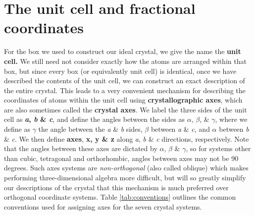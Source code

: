 \section{The unit cell and fractional coordinates}

 For the box we used to construct our ideal crystal, we give the name the \textbf{unit cell.}
 We still need not consider exactly how the atoms are arranged within that box, but since every box (or equivalently unit cell) is identical, once we have described the contents of the unit cell, we can construct an exact description of the entire crystal. 
 This leads to a very convenient mechanism for describing the coordinates of atoms within the unit cell using \textbf{crystallographic axes}, which are also sometimes called the \textbf{crystal axes}. We label the three sides of the unit cell as \textbf{\textit{a}, \textit{b} \& \textit{c}}, and define the angles between the sides as $\alpha$, $\beta$, \& $\gamma$, where we define as $\gamma$ the angle between the \textit{a} \& \textit{b} sides, $\beta$ between \textit{a }\& \textit{c}, and $\alpha$ between \textit{b} \& \textit{c}. We then define \textbf{axes}, \textbf{x, y \& z} along \textit{a}, \textit{b} \& \textit{c} directions, respectively. Note that the angles between these axes are dictated by $\alpha$, $\beta$ \& $\gamma$, so for systems other than cubic, tetragonal and orthorhombic, angles between axes may not be 90 degrees. Such axes systems are \textit{non-orthogonal} (also called oblique) which makes performing three-dimensional algebra more difficult, but will so greatly simplify our descriptions of the crystal that this mechanism is much preferred over orthogonal coordinate systems. Table \ref{tab:conventions} outlines the common conventions used for assigning axes for the seven crystal systems.
 
